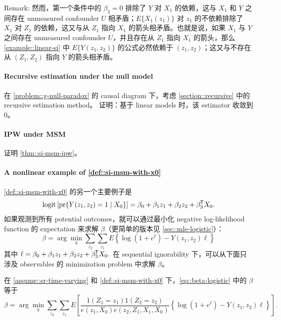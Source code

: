 Remark:
然而，第一个条件中的 $\beta_3 = 0$ 排除了 $Y$ 对 $X_1$ 的依赖，这与 $X_1$ 和 $Y$ 之间存在 unmeasured confounder $U$ 相矛盾；$E\{ X_1(z_1)\} $ 对 $z_1$ 的不依赖排除了 $X_1$ 对 $Z_1$ 的依赖，这又与从 $Z_1$ 指向 $X_1$ 的箭头相矛盾。也就是说，如果 $X_1$ 与 $Y$ 之间存在 unmeasured confounder $U$，并且存在从 $Z_1$ 指向 $X_1$ 的箭头，那么 \cref{example::linear-si} 中 $E\{ Y(z_1, z_2) \} $ 的公式必然依赖于 $(z_1, z_2)$；这又与不存在从 $(Z_1, Z_2)$ 指向 $Y$ 的箭头相矛盾。


\paragraph{Recursive estimation under the null model}\label{problem::recursive-null}


在 \cref{problem::g-null-paradox} 的 causal diagram 下，考虑 \cref{section::recursive} 中的 recursive estimation method。
证明：基于 linear models 时，该 estimator 收敛到 0。



\paragraph{IPW under MSM}\label{problem::ipw-msm}


证明 \cref{thm::si-msm-ipw}。


\paragraph{A nonlinear example of \cref{def::si-msm-with-x0}}\label{hw::logistic-msm}


\cref{def::si-msm-with-x0} 的另一个主要例子是
\begin{equation}\label{eq::logistic-msm}
\text{logit} \left[ \textup{pr}\{  Y(z_1, z_2)  =1  \mid X_0\}  \right] = \beta_0 + \beta_1 z_1 + \beta_2 z_2 + \beta_3^{\mkern-1.5mu\mathsf{T}} X_0 .
\end{equation}
如果观测到所有 potential outcomes，就可以通过最小化 negative log-likelihood function 的 expectation 来求解 $\beta$（更简单的版本见 \cref{sec::mle-logistic}）：
\begin{equation}
\label{eq::beta-logistic}
\beta = \arg\min_b   \sum_{z_2}\sum_{z_1}  E\left\{   \log (1 + e^{\ell })
- Y(z_1, z_2)  \ell  \right\}
\end{equation}
其中 $\ell = \beta_0 + \beta_1 z_1 + \beta_2 z_2 + \beta_3^{\mkern-1.5mu\mathsf{T}} X_0.$
在 sequential ignorability 下，可以从下面只涉及 observables 的 minimization problem 中求解 $\beta$。


\begin{theorem}
\label{thm::si-msm-ipw-logistic}
在 \cref{assume::sr-time-varying} 和 \cref{def::si-msm-with-x0} 下，\cref{eq::beta-logistic} 中的 $\beta$ 等于
$$
\beta = \arg\min_b \sum_{z_2}\sum_{z_1}  E\left[   \frac{  1(Z_1=z_1) 1(Z_2=z_2)   }{   e(z_1, X_0) e(z_2, Z_1, X_1, X_0)     }      
\left\{   \log (1 + e^{\ell })
- Y(z_1, z_2)  \ell  \right\} \right] .
$$
\end{theorem}

